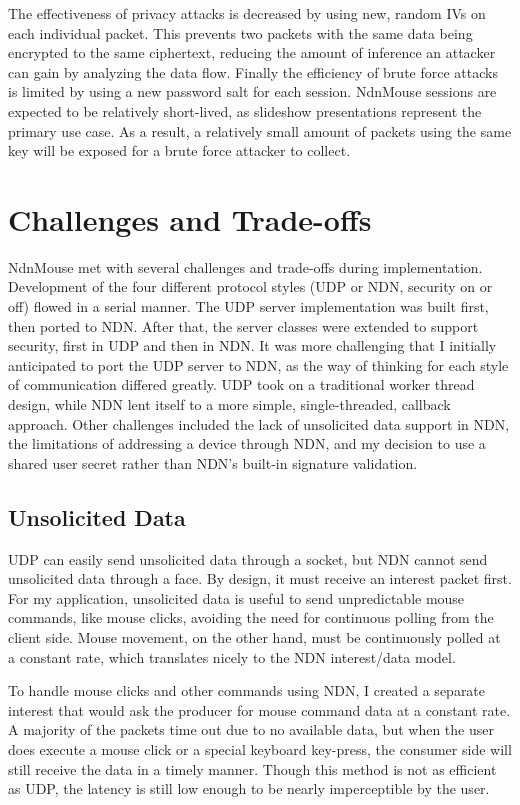 \documentclass{sig-alternate}
\renewcommand\_{\textunderscore\allowbreak}  %
\begin{document}
The effectiveness of privacy attacks is decreased by using new, random IVs on each individual packet. This prevents two packets with the same data being encrypted to the same ciphertext, reducing the amount of inference an attacker can gain by analyzing the data flow. Finally the efficiency of brute force attacks is limited by using a new password salt for each session. NdnMouse sessions are expected to be relatively short-lived, as slideshow presentations represent the primary use case. As a result, a relatively small amount of packets using the same key will be exposed for a brute force attacker to collect.
	
\section{Challenges and Trade-offs}
\label{sec:challenges}
NdnMouse met with several challenges and trade-offs during implementation. Development of the four different protocol styles (UDP or NDN, security on or off) flowed in a serial manner. The UDP server implementation was built first, then ported to NDN. After that, the server classes were extended to support security, first in UDP and then in NDN. It was more challenging that I initially anticipated to port the UDP server to NDN, as the way of thinking for each style of communication differed greatly. UDP took on a traditional worker thread design, while NDN lent itself to a more simple, single-threaded, callback approach. Other challenges included the lack of unsolicited data support in NDN, the limitations of addressing a device through NDN, and my decision to use a shared user secret rather than NDN's built-in signature validation.

\subsection{Unsolicited Data}
UDP can easily send unsolicited data through a socket, but NDN cannot send unsolicited data through a face. By design, it must receive an interest packet first. For my application, unsolicited data is useful to send unpredictable mouse commands, like mouse clicks, avoiding the need for continuous polling from the client side. Mouse movement, on the other hand, must be continuously polled at a constant rate, which translates nicely to the NDN interest/data model.

To handle mouse clicks and other commands using NDN, I created a separate interest that would ask the producer for mouse command data at a constant rate. A majority of the packets time out due to no available data, but when the user does execute a mouse click or a special keyboard key-press, the consumer side will still receive the data in a timely manner. Though this method is not as efficient as UDP, the latency is still low enough to be nearly imperceptible by the user.
\end{document}
